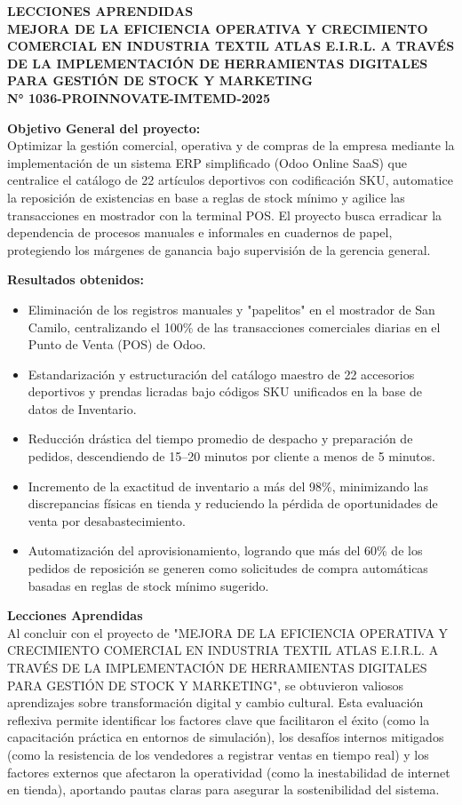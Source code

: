 \documentclass[11pt]{article}
\begin{document}
\begin{center}
    {\Large \textbf{LECCIONES APRENDIDAS}}\\[0.25cm]
    {\Large \textbf{MEJORA DE LA EFICIENCIA OPERATIVA Y CRECIMIENTO COMERCIAL EN INDUSTRIA TEXTIL ATLAS E.I.R.L. A TRAVÉS DE LA IMPLEMENTACIÓN DE HERRAMIENTAS DIGITALES PARA GESTIÓN DE STOCK Y MARKETING}}\\[0.25cm]
    {\large \textbf{N° 1036-PROINNOVATE-IMTEMD-2025}}
\end{center}

\textbf{Objetivo General del proyecto:}\\
Optimizar la gestión comercial, operativa y de compras de la empresa mediante la implementación de un sistema ERP simplificado (Odoo Online SaaS) que centralice el catálogo de 22 artículos deportivos con codificación SKU, automatice la reposición de existencias en base a reglas de stock mínimo y agilice las transacciones en mostrador con la terminal POS. El proyecto busca erradicar la dependencia de procesos manuales e informales en cuadernos de papel, protegiendo los márgenes de ganancia bajo supervisión de la gerencia general.

\textbf{Resultados obtenidos:}
\begin{itemize}
    \item Eliminación de los registros manuales y "papelitos" en el mostrador de San Camilo, centralizando el 100\% de las transacciones comerciales diarias en el Punto de Venta (POS) de Odoo.
    \item Estandarización y estructuración del catálogo maestro de 22 accesorios deportivos y prendas licradas bajo códigos SKU unificados en la base de datos de Inventario.
    \item Reducción drástica del tiempo promedio de despacho y preparación de pedidos, descendiendo de 15--20 minutos por cliente a menos de 5 minutos.
    \item Incremento de la exactitud de inventario a más del 98\%, minimizando las discrepancias físicas en tienda y reduciendo la pérdida de oportunidades de venta por desabastecimiento.
    \item Automatización del aprovisionamiento, logrando que más del 60\% de los pedidos de reposición se generen como solicitudes de compra automáticas basadas en reglas de stock mínimo sugerido.
\end{itemize}

\textbf{Lecciones Aprendidas}\\
Al concluir con el proyecto de "MEJORA DE LA EFICIENCIA OPERATIVA Y CRECIMIENTO COMERCIAL EN INDUSTRIA TEXTIL ATLAS E.I.R.L. A TRAVÉS DE LA IMPLEMENTACIÓN DE HERRAMIENTAS DIGITALES PARA GESTIÓN DE STOCK Y MARKETING", se obtuvieron valiosos aprendizajes sobre transformación digital y cambio cultural. Esta evaluación reflexiva permite identificar los factores clave que facilitaron el éxito (como la capacitación práctica en entornos de simulación), los desafíos internos mitigados (como la resistencia de los vendedores a registrar ventas en tiempo real) y los factores externos que afectaron la operatividad (como la inestabilidad de internet en tienda), aportando pautas claras para asegurar la sostenibilidad del sistema.
\end{document}
